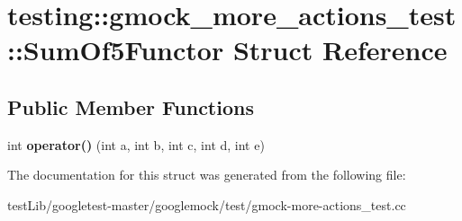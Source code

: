 \hypertarget{structtesting_1_1gmock__more__actions__test_1_1SumOf5Functor}{}\section{testing\+:\+:gmock\+\_\+more\+\_\+actions\+\_\+test\+:\+:Sum\+Of5\+Functor Struct Reference}
\label{structtesting_1_1gmock__more__actions__test_1_1SumOf5Functor}
\subsection*{Public Member Functions}
\begin{DoxyCompactItemize}
\item 
\mbox{\label{structtesting_1_1gmock__more__actions__test_1_1SumOf5Functor_ab7c80522ca7401c89e86eecb03fe1fbb}} 
int {\bfseries operator()} (int a, int b, int c, int d, int e)
\end{DoxyCompactItemize}


The documentation for this struct was generated from the following file\+:\begin{DoxyCompactItemize}
\item 
test\+Lib/googletest-\/master/googlemock/test/gmock-\/more-\/actions\+\_\+test.\+cc\end{DoxyCompactItemize}
